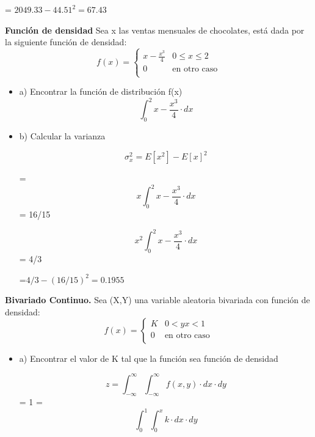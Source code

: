 \documentclass{oxmathproblems}
\begin{document}
\begin{questions}
= $ 2049.33 - 44.51^2 = 67.43$ 


\miquestion \textbf{Función de densidad} Sea x las ventas mensuales de chocolates, está dada por la siguiente función de densidad: 
\[ 
f(x) = 
     \begin{cases}
       x- \frac{x^3}{4}  & 0  \leq x  \leq 2 \\
       0 & \text{en otro caso} \\
     \end{cases}
\]
$$$$
\begin{itemize}
\item  a) Encontrar la función de distribución f(x) 
\begin{equation}
 \int_{0}^{2} x- \frac{x^3}{4} \cdot dx
\end{equation} 


\item  b) Calcular la varianza

$$ \sigma_x^2 = E[x^2]-E[x]^2 $$ 

= \begin{equation}
 x \int_{0}^{2} x- \frac{x^3}{4} \cdot dx
\end{equation}
= 16/15


\begin{equation}
 x^2 \int_{0}^{2} x- \frac{x^3}{4} \cdot dx
\end{equation} 
= 4/3


=$  4/3 - (16/15)^2 = 0.1955 $
\end{itemize}

\miquestion \textbf {Bivariado Continuo. } Sea (X,Y) una variable aleatoria bivariada con función de densidad: 
\[ 
f(x) = 
     \begin{cases}
        K  & 0  < {y}   
        {x} < 1 \\
       0 & \text{en otro caso} \\
     \end{cases}
\]


\begin{itemize}
\item  a) Encontrar el valor de K tal que la función sea función de densidad 

\begin{equation}
z = \int _{-\infty}^{\infty} \int _{-\infty}^{\infty} f(x,y) \cdot dx \cdot dy
\end{equation} 
= 1 
= 
 \begin{equation}
 \int _{0}^{1} \int _{0}^{x} k \cdot dx \cdot dy
\end{equation}



\end{itemize}
\end{questions}
\end{document}

